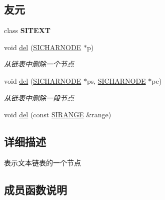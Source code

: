 \subsection*{友元}
\begin{DoxyCompactItemize}
\item 
\mbox{\label{class_s_i_c_h_a_r_n_o_d_e_aed883eedffb01c3b6a299f070b3e1e55}} 
class {\bfseries S\+I\+T\+E\+XT}
\item 
void \hyperlink{class_s_i_c_h_a_r_n_o_d_e_a0a26b116c7c24705ce6e46295c9ff463}{del} (\hyperlink{class_s_i_c_h_a_r_n_o_d_e}{S\+I\+C\+H\+A\+R\+N\+O\+DE} $\ast$p)
\begin{DoxyCompactList}\small\item\em 从链表中删除一个节点~\newline
\end{DoxyCompactList}\item 
void \hyperlink{class_s_i_c_h_a_r_n_o_d_e_a2fc2b8710ced10535536295e09d52dca}{del} (\hyperlink{class_s_i_c_h_a_r_n_o_d_e}{S\+I\+C\+H\+A\+R\+N\+O\+DE} $\ast$ps, \hyperlink{class_s_i_c_h_a_r_n_o_d_e}{S\+I\+C\+H\+A\+R\+N\+O\+DE} $\ast$pe)
\begin{DoxyCompactList}\small\item\em 从链表中删除一段节点~\newline
\end{DoxyCompactList}\item 
void \hyperlink{class_s_i_c_h_a_r_n_o_d_e_ae8a96a04922f1d8b6da37c812048f6ad}{del} (const \hyperlink{struct_s_i_r_a_n_g_e}{S\+I\+R\+A\+N\+GE} \&range)
\end{DoxyCompactItemize}


\subsection{详细描述}
表示文本链表的一个节点~\newline


\subsection{成员函数说明}
\mbox{\label{class_s_i_c_h_a_r_n_o_d_e_ab0d781b8bb3d87470d1826cea65b61aa}} 
